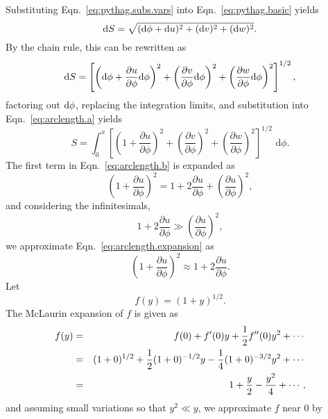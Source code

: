Substituting Eqn.~\ref{eq:pythag.subs.vars} into Eqn.~\ref{eq:pythag.basic} yields
\begin{equation}
\text dS = \sqrt{(\text d\phi + \text du)^2+(\text dv)^2+(\text dw)^2}.
\end{equation} 
By the chain rule, this can be rewritten as
\begin{equation}
\text dS = \left[\left(\text d\phi + \frac{\partial u}{\partial\phi}\text d\phi\right)^2+\left(\frac{\partial v}{\partial\phi}\text d\phi\right)^2+\left(\frac{\partial w}{\partial\phi}\text d\phi\right)^2\right]^{1/2},
\end{equation}
factoring out $\text d\phi$, replacing the integration limits, and substitution into Eqn.~\ref{eq:arclength.a} yields
\begin{equation}
S = \int_0^x \left[\left(1 + \frac{\partial u}{\partial\phi}\right)^2+\left(\frac{\partial v}{\partial\phi}\right)^2+\left(\frac{\partial w}{\partial\phi}\right)^2\right]^{1/2}\text{ d}\phi.
\label{eq:arclength.b}
\end{equation}
The first term in Eqn.~\ref{eq:arclength.b} is expanded as
\begin{equation}
\left(1 + \frac{\partial u}{\partial\phi}\right)^2 = 1+2\frac{\partial u}{\partial\phi}+\left(\frac{\partial u}{\partial\phi}\right)^2,
\label{eq:arclength.expansion}
\end{equation}
and considering the infinitesimals,
\begin{equation}
1+2\frac{\partial u}{\partial\phi} \gg \left(\frac{\partial u}{\partial\phi}\right)^2,
\end{equation}
we approximate Eqn.~\ref{eq:arclength.expansion} as
\begin{equation}
\left(1 + \frac{\partial u}{\partial\phi}\right)^2 \approx 1+2\frac{\partial u}{\partial\phi}.
\label{eq:arclength.u.approx}
\end{equation}
Let
\begin{equation}
f(y) = (1+y)^{1/2}.
\end{equation}
The McLaurin expansion of $f$ is given as
\begin{eqnarray}
f(y) &=& f(0)+f'(0)y+\frac{1}{2}f''(0)y^2+\cdots{\vrule width 0in depth .1in}\nonumber \\
&=& (1+0)^{1/2}+\frac{1}{2}(1+0)^{-1/2}y-\frac{1}{4}(1+0)^{-3/2}y^2+\cdots{\vrule width 0in depth .1in}\nonumber \\
&=& 1+\frac{y}{2}-\frac{y^2}{4}+\cdots,
\end{eqnarray}
and assuming small variations so that $y^2\ll y$, we approximate $f$ near 0 by
